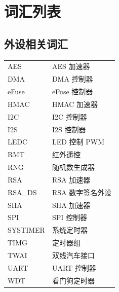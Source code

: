 \section*{词汇列表}\label{glossary}
\rhead{\Navigation}

\subsection*{外设相关词汇}

\begin{longtable}[c]{p{3cm}p{12cm} }

AES & AES 加速器 \\ 
DMA & DMA 控制器 \\
eFuse & eFuse 控制器 \\
HMAC & HMAC 加速器 \\ 
I2C & I2C 控制器 \\
I2S & I2S 控制器 \\
LEDC & LED 控制 PWM \\
RMT & 红外遥控 \\
RNG & 随机数生成器 \\
RSA & RSA 加速器 \\
RSA\_DS & RSA 数字签名外设 \\
SHA & SHA 加速器 \\
SPI & SPI 控制器 \\
SYSTIMER & 系统定时器  \\ 
TIMG & 定时器组 \\
TWAI & 双线汽车接口 \\ 
UART & UART 控制器 \\
WDT & 看门狗定时器 \\ 

\end{longtable}





